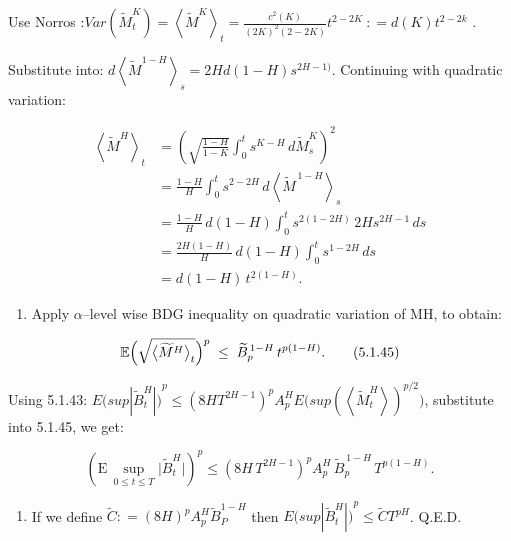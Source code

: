 \documentclass[12pt,a4paper]{report}
\numberwithin{equation}{section}
\begin{document}
Use Norros \cite{norros1999elementary_112}
:\(Var\left( {\widetilde{M}}_{t}^{K} \right) = \left\langle {\widetilde{M}}^{K} \right\rangle_{t} = \frac{c^{2}(K)}{(2K)^{2}(2 - 2K)}t^{2 - 2K}\ : = d(K)t^{2 - 2k}\)
.

Substitute into:
\(d\left\langle {\widetilde{M}}^{1 - H} \right\rangle_{s} = 2Hd(1 - H)s^{2H - 1)}\).
Continuing with quadratic variation:

\begin{equation}
\begin{aligned}
\left\langle \widetilde{M}^{H} \right\rangle_{t}
&= \left( \sqrt{\frac{1-H}{1-K}}\int_{0}^{t} s^{K-H}\, d\widetilde{M}^{K}_{s} \right)^{2} \\
&= \frac{1-H}{H}\int_{0}^{t} s^{2-2H}\, d\left\langle \widetilde{M}^{\,1-H} \right\rangle_{s} \\
&= \frac{1-H}{H}\,d(1-H)\int_{0}^{t} s^{2(1-2H)}\,2H s^{2H-1}\,ds \\
&= \frac{2H(1-H)}{H}\,d(1-H)\int_{0}^{t} s^{1-2H}\,ds \\
&= d(1-H)\,t^{2(1-H)} .
\end{aligned}
\tag{5.1.44}
\end{equation}


\begin{enumerate}
\def\labelenumi{\arabic{enumi}.}
\setcounter{enumi}{6}
\item
  Apply $\alpha$--level wise BDG inequality on quadratic variation of MH, to
  obtain:
\end{enumerate}

\begin{equation}
\mathbb{E}\Bigl(\sqrt{\bigl\langle \widetilde{M}^{H}\bigr\rangle_{t}}\Bigr)^{p}
\;\le\;
\widetilde{B}_{p}^{\,1-H}\, t^{p(1-H)} .
\tag{5.1.45}
\end{equation}


Using 5.1.43:
\({{E(sup}\left| {\widetilde{B}}_{t}^{H} \right|)}^{p} \leq {(8HT^{2H - 1})}^{p}{A_{p}^{H}E(sup}{{(\left\langle {\widetilde{M}}_{t}^{H} \right\rangle)}^{p/2})}\),
substitute into 5.1.45, we get:

\begin{equation}
\left(\mathrm{E}\,\sup_{0\le t\le T}\bigl|\widetilde{B}^{H}_{t}\bigr|\right)^{p}
\le \left(8H\,T^{2H-1}\right)^{p} A_{p}^{H}\,\widetilde{B}_{p}^{\,1-H}\,T^{p(1-H)}.
\tag{5.1.46}\label{eq:5.1.46}
\end{equation}


\begin{enumerate}
\def\labelenumi{\arabic{enumi}.}
\setcounter{enumi}{7}
\item
  If we define
  \(\widetilde{C}: = {(8H)}^{p}A_{p}^{H}{\widetilde{B}}_{P}^{1 - H}\)
  then
  \({{E(sup}\left| {\widetilde{B}}_{t}^{H} \right|)}^{p} \leq \widetilde{C}T^{pH}\).
  Q.E.D.
\end{enumerate}
\end{document}
